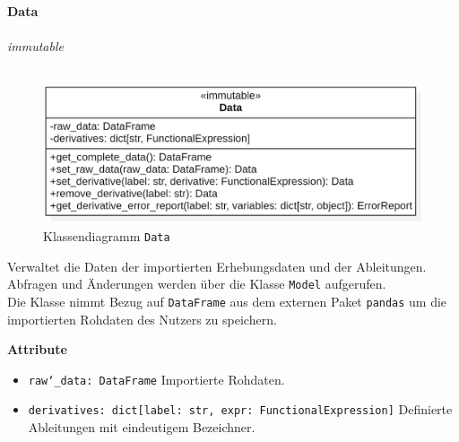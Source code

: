 \documentclass{article}
\begin{document}
\newpage
\textbf{\large{Data}}\\\\
\textit{\flqq{}immutable\frqq}\normalsize\\\\
\begin{figure}[H]%
    \centering
    \includegraphics[width=13cm]{entwurf/Entwurf_dokument/img/cls/model/Data.png}
    \caption{Klassendiagramm \texttt{Data}}
\end{figure}

Verwaltet die Daten der importierten Erhebungsdaten und der Ableitungen. Abfragen und Änderungen werden über die Klasse \texttt{Model} aufgerufen.\\
Die Klasse nimmt Bezug auf \texttt{DataFrame} aus dem externen Paket \texttt{pandas} um die importierten Rohdaten des Nutzers zu speichern.
\newline \newline

\textbf{{Attribute}}
\begin{itemize}
\item \texttt{raw\char`_data: DataFrame} \newline Importierte Rohdaten.
\item \texttt{derivatives: dict[label: str, expr: FunctionalExpression]} \newline Definierte Ableitungen mit eindeutigem Bezeichner.
\\\\
\end{itemize}
\end{document}
